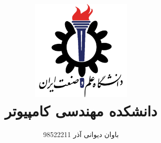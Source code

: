 \title{
    \center
    \includegraphics[width=5cm, height=5cm]{images/IUST_logo_color.png} \\
    دانشکده مهندسی کامپیوتر \\[25pt]     
\CourseName
}

\author{
    باوان دیوانی آذر  98522211 
  \\[25pt]
}
\date{\Semester}